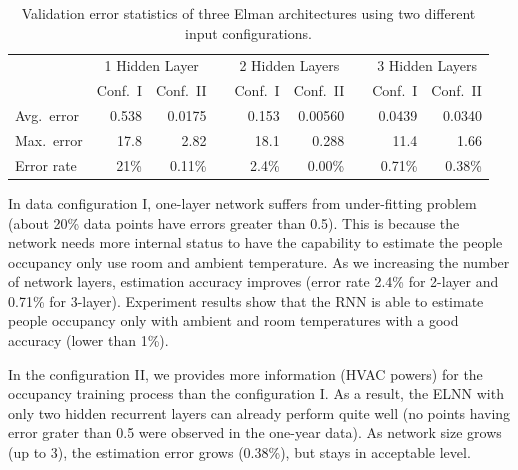 \begin{table}[t]
    \centering
    \begingroup
    \setlength{\tabcolsep}{3.6pt} %
    \begin{tabular}{lrrcrrcrr}
        \toprule
        & \multicolumn{2}{c}{1 Hidden Layer} && \multicolumn{2}{c}{2 Hidden Layers} && \multicolumn{2}{c}{3 Hidden Layers}\\
        \cmidrule{2-3} \cmidrule{5-6} \cmidrule{8-9}
        & Conf.~I & Conf.~II && Conf.~I & Conf.~II && Conf.~I & Conf.~II\\
        \midrule
        Avg.~error & 0.538      & 0.0175    && 0.153     & 0.00560   && 0.0439      & 0.0340    \\
        Max.~error & 17.8       & 2.82      && 18.1      & 0.288     && 11.4        & 1.66      \\
        Error rate & 21\%       & 0.11\%    && 2.4\%     & 0.00\%    && 0.71\%      & 0.38\%    \\
        \bottomrule
    \end{tabular}
    \endgroup
    \caption{Validation error statistics of three Elman architectures using two
        different input configurations.}
    \label{tab:verr-stat}
\end{table}

In data configuration I, one-layer network suffers from under-fitting
problem (about 20\% data points have errors greater than 0.5). This is
because the network needs more internal status to have the capability
to estimate the people occupancy only use room and ambient
temperature.  As we increasing the number of network layers,
estimation accuracy improves (error rate 2.4\% for 2-layer and 0.71\%
for 3-layer). Experiment results show that the RNN is able to estimate
people occupancy only with ambient and room temperatures with a good
accuracy (lower than 1\%).

In the configuration II, we provides more information (HVAC powers)
for the occupancy training process than the configuration I. As a
result, the ELNN with only two hidden recurrent layers can
already perform quite well (no points having error grater than 0.5
were observed in the one-year data). As network size grows (up to 3),
the estimation error grows (0.38\%), but stays in acceptable level.

